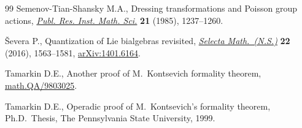 \documentclass[pdftex]{sigma}
\numberwithin{equation}{section}
\theoremstyle{definition}
\begin{document}
\begin{thebibliography}{99}
Semenov-Tian-Shansky M.A., Dressing transformations and {P}oisson group
 actions, \href{http://dx.doi.org/10.2977/prims/1195178514}{\textit{Publ. Res. Inst. Math. Sci.}} \textbf{21} (1985), 1237--1260.

{\v{S}}evera P., Quantization of {L}ie bialgebras revisited, \href{http://dx.doi.org/10.1007/s00029-016-0227-0}{\textit{Selecta
 Math.~(N.S.)}} \textbf{22} (2016), 1563--1581, \href{http://arxiv.org/abs/1401.6164}{arXiv:1401.6164}.

Tamarkin D.E., Another proof of {M}.~{K}ontsevich formality theorem,
 \href{http://arxiv.org/abs/math.QA/9803025}{math.QA/9803025}.

Tamarkin D.E., Operadic proof of {M}.~{K}ontsevich's formality theorem, Ph.D.~Thesis, The Pennsylvania State University, 1999.

\end{thebibliography}\LastPageEnding
\end{document}
